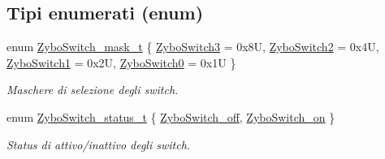 \subsection*{Tipi enumerati (enum)}
\begin{DoxyCompactItemize}
\item 
enum \hyperlink{group___switch_ga2e0602a824354f25c395f938caba3703}{Zybo\+Switch\+\_\+mask\+\_\+t} \{ \hyperlink{group___switch_gga2e0602a824354f25c395f938caba3703a73ccea5ad8c919fe962e9a67a3733ee3}{Zybo\+Switch3} = 0x8U, 
\hyperlink{group___switch_gga2e0602a824354f25c395f938caba3703aac2f5ebb28eb3bd93fcdf8019b6a3e9e}{Zybo\+Switch2} = 0x4U, 
\hyperlink{group___switch_gga2e0602a824354f25c395f938caba3703a694a25c87b1ec597d2a6032bf5d34b0f}{Zybo\+Switch1} = 0x2U, 
\hyperlink{group___switch_gga2e0602a824354f25c395f938caba3703a84350e8b6e7a7e2cabf22fc7a1a5c651}{Zybo\+Switch0} = 0x1U
 \}\begin{DoxyCompactList}\small\item\em Maschere di selezione degli switch. \end{DoxyCompactList}
\item 
enum \hyperlink{group___switch_ga4ba6b49b2f47ebb464aefcea7e23e04a}{Zybo\+Switch\+\_\+status\+\_\+t} \{ \hyperlink{group___switch_gga4ba6b49b2f47ebb464aefcea7e23e04aa1d686faf83e8606e68eec0b7e525a755}{Zybo\+Switch\+\_\+off}, 
\hyperlink{group___switch_gga4ba6b49b2f47ebb464aefcea7e23e04aafba009508b8822de867af69034e3e4f8}{Zybo\+Switch\+\_\+on}
 \}\begin{DoxyCompactList}\small\item\em Status di attivo/inattivo degli switch. \end{DoxyCompactList}
\end{DoxyCompactItemize}
